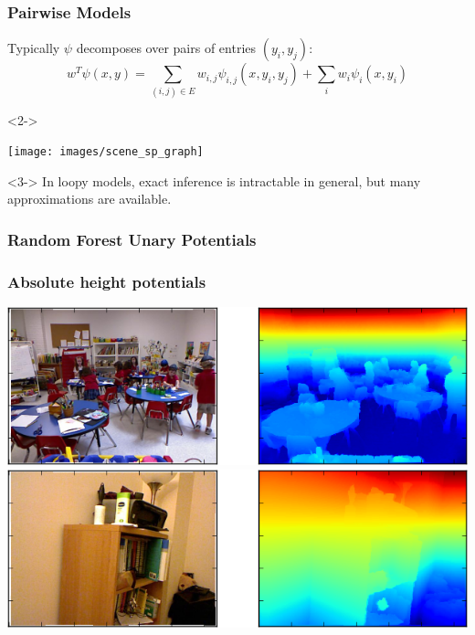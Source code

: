\documentclass[final,ignorenonframetext,compress]{beamer}
\begin{document}
    \begin{frame}
        \frametitle{Pairwise Models}
        Typically $\psi$ decomposes over pairs of entries $(y_i, y_j)$:
        \[w^T \psi(x, y) = \sum_{(i, j) \in E} w_{i,j} \psi_{i,j}(x, y_i, y_j) + \sum_i w_i \psi_i(x, y_i)\]
        \vspace{-8mm}
        \begin{visibleenv}<2->
            \begin{center}
                \texttt{[image: images/scene\_sp\_graph]}
            \end{center}
        \end{visibleenv}
        \vspace{-5mm}
        \begin{visibleenv}<3->
            In loopy models, exact inference is intractable in general, but many approximations are available.
        \end{visibleenv}
    \end{frame}

    \begin{frame}
        \frametitle{Random Forest Unary Potentials}
    \end{frame}

    \begin{frame}
        \frametitle{Absolute height potentials}
        \begin{center}
            \includegraphics[width=\linewidth]{images/height_success}\\
            \vspace{3mm}
            \includegraphics[width=\linewidth]{images/height_failure}
        \end{center}
    \end{frame}
\end{document}
